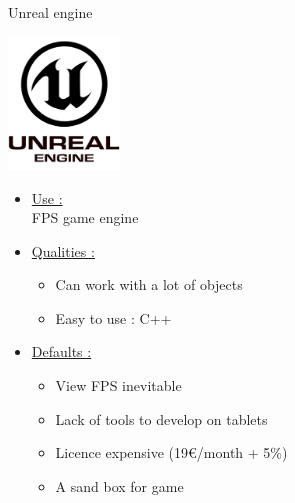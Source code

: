 \documentclass[a4paper,10pt]{beamer}
\begin{document}
			\begin{frame}{Unreal engine}
				\begin{multicols}{2}
				\includegraphics[height=100pt]{images/logos/Unreal_Engine.png}\\
				
				\columnbreak 
				
				 \begin{itemize}
				 	\item \underline{Use :}\\		
					 FPS game engine	 
					 \item \underline{Qualities :}\\
						 \begin{itemize}
						 	\item Can work with a lot of objects
						 	\item Easy to use : C++
						 \end{itemize}
				 \end{itemize}		 
				\end{multicols}
				\begin{itemize}
					\item \underline{Defaults :}\\
					\begin{itemize}
						\item View FPS inevitable
						\item Lack of tools to develop on tablets
						\item Licence expensive (19\euro/month + 5\%)
						\item A sand box for game
					\end{itemize}
				\end{itemize}
			\end{frame}
			
\end{document}
